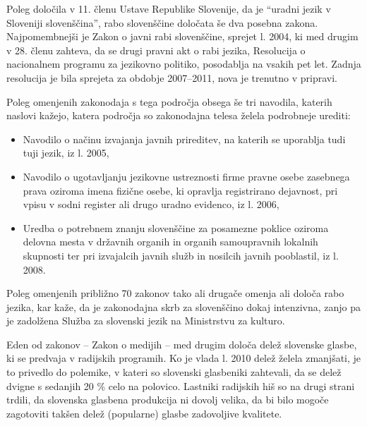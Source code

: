 \begin{multicols}{2}

Poleg določila v 11. členu Ustave Republike Slovenije, da je “uradni jezik v Sloveniji slovenščina”, rabo slovenščine določata še dva posebna zakona. Naj\-pomembnejši je Zakon o javni rabi slovenščine, sprejet l. 2004, ki med drugim v 28. členu zah\-teva, da se drugi pravni akt o rabi jezika, Resolucija o nacionalnem programu za jezikovno politiko, posodab\-lja na vsakih pet let. Zadnja resolucija je bila sprejeta za obdobje 2007--2011, nova je trenutno v pripravi. \vspace*{0.1 cm}

Poleg omenjenih zakonodaja s tega področja obsega še tri navodila, katerih naslovi kažejo, katera področja so zakonodajna telesa želela podrobneje urediti: 
\vspace*{0.1 cm}
\begin{itemize}
\item Navodilo o načinu izvajanja javnih prireditev, na katerih se uporab\-lja tudi tuji jezik, iz l. 2005,
\item Navodilo o ugotav\-ljanju jezikovne ustreznosti firme pravne osebe zasebnega prava oziroma imena fizične osebe, ki oprav\-lja registrirano dejavnost, pri vpisu v sodni register ali drugo uradno evidenco, iz l. 2006,
\item Uredba o potrebnem znanju slovenščine za posamezne poklice oziroma delovna mesta v državnih organih in organih samou\-pravnih lokalnih skupnosti ter pri izvajalcih javnih služb in nosilcih javnih pooblastil, iz l. 2008.
\end{itemize} \vspace*{0.1 cm}

Poleg omenjenih približno 70 zakonov tako ali drugače omenja ali določa rabo jezika, kar kaže, da je zakonodajna skrb za slovenščino dokaj intenzivna, zanjo pa je zadolžena Služba za slovenski jezik na Ministrstvu za kulturo. 

Eden od zakonov – Zakon o medijih – med drugim določa delež slovenske glasbe, ki se predvaja v radijskih programih. Ko je vlada l. 2010 delež želela zmanjšati, je to privedlo do polemike, v kateri so slovenski glasbeniki zah\-tevali, da se delež dvigne s sedanjih 20 \% celo na polovico. Lastniki radijskih hiš so na drugi strani trdili, da slovenska glasbena produkcija ni dovolj velika, da bi bilo mogoče zagotoviti takšen delež (popularne) glasbe zadovoljive kvalitete.



\end{multicols}
